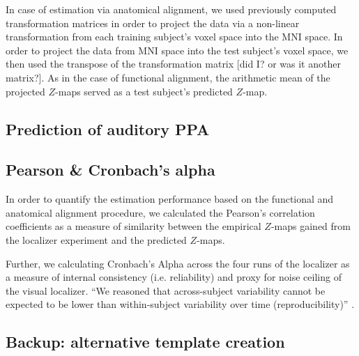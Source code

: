 
In case of estimation via anatomical alignment, we used previously computed
transformation matrices
\citep[][\href{https://github.com/psychoinformatics-de/studyforrest-data-templatetransforms}{\url{github.com/psychoinformatics-de/studyforrest-data-templatetransforms}}]{hanke2014audiomovie}
in order to project the data via a non-linear transformation from each training
subject's voxel space into the MNI space.
In order to project the data from MNI space into the test subject's voxel space,
we then used the transpose of the transformation matrix [did I? or was it
another matrix?].
As in the case of functional alignment, the arithmetic mean of the projected
$Z$-maps served as a test subject's predicted $Z$-map.


\subsection{Prediction of auditory PPA}




\subsection{Pearson \& Cronbach's alpha}
In order to quantify the estimation performance based on the functional and
anatomical alignment procedure, we calculated the Pearson's correlation
coefficients as a measure of similarity between the empirical $Z$-maps gained
from the localizer experiment and the predicted $Z$-maps.

Further, we calculating Cronbach's Alpha across the four runs of the localizer
as a measure of internal consistency (i.e.  reliability) and proxy for noise
ceiling of the visual localizer.
%
``We reasoned that across-subject variability cannot be expected to be lower
than within-subject variability over time (reproducibility)''
\citep{rosenke2021probabilistic}.


\subsection{Backup: alternative template creation}

